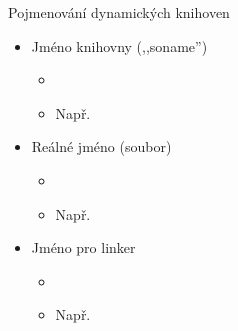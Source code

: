 
\begin{frame}{Pojmenování dynamických knihoven}

  \begin{itemize}
    \item Jméno knihovny (,,soname'')
    \begin{itemize}
      \item {}
      \item Např.\ 
    \end{itemize}

    \item Reálné jméno (soubor)
    \begin{itemize}
      \item {}
      \item Např.\ 
    \end{itemize}

    \item Jméno pro linker
    \begin{itemize}
      \item {}
      \item Např.\ 
    \end{itemize}
  \end{itemize}

\end{frame}

